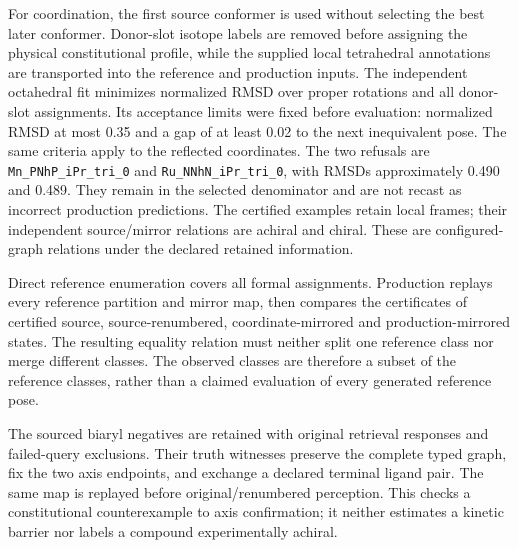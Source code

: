 \documentclass[pdflatex,sn-mathphys-num,referee,lineno]{sn-jnl}
\newcommand{\code}[1]{\texttt{#1}}
\theoremstyle{plain}
\theoremstyle{remark}
\theoremstyle{definition}
\begin{document}
For coordination, the first source conformer is used without selecting the
best later conformer. Donor-slot isotope labels are removed before assigning
the physical constitutional profile, while the supplied local tetrahedral
annotations are transported into the reference and production inputs.
The independent octahedral fit minimizes normalized RMSD over proper
rotations and all donor-slot assignments. Its acceptance limits were fixed
before evaluation: normalized RMSD at most 0.35 and a gap of at least 0.02
to the next inequivalent pose. The same criteria apply to the reflected
coordinates. The two refusals are \code{Mn\_PNhP\_iPr\_tri\_0} and
\code{Ru\_NNhN\_iPr\_tri\_0}, with RMSDs approximately 0.490 and 0.489.
They remain in the selected denominator and are not recast as incorrect
production predictions. The \ChemicalCoordinationCertified{} certified
examples retain \ChemicalCoordinationRetainedTetrahedralFrames{} local frames;
their independent source/mirror relations are
\ChemicalCoordinationSourceAchiral{} achiral and
\ChemicalCoordinationSourceChiral{} chiral. These are configured-graph
relations under the declared retained information.

Direct reference enumeration covers all
\ChemicalCoordinationReferenceAssignments{} formal assignments. Production
replays every reference partition and mirror map, then compares the
certificates of certified source, source-renumbered, coordinate-mirrored and
production-mirrored states. The resulting equality relation must neither split
one reference class nor merge different classes. The
\ChemicalCoordinationObservedSourceMirrorClasses{} observed classes are
therefore a subset of the \ChemicalCoordinationReferenceClasses{} reference
classes, rather than a claimed evaluation of every generated reference pose.

The sourced biaryl negatives are retained with original retrieval responses
and failed-query exclusions. Their truth witnesses preserve the complete
typed graph, fix the two axis endpoints, and exchange a declared terminal
ligand pair. The same map is replayed before original/renumbered perception.
This checks a constitutional counterexample to axis confirmation; it neither
estimates a kinetic barrier nor labels a compound experimentally achiral.
\end{document}
